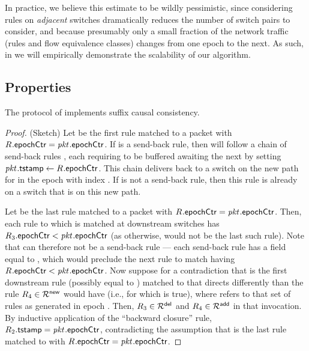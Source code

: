 In practice, we believe this estimate to be wildly pessimistic, since
considering rules on \textit{adjacent} switches dramatically reduces
the number of switch pairs to consider, and because presumably only a
small fraction of the network traffic (rules and flow equivalence
classes) changes from one epoch to the next.  As such, in
 we will empirically demonstrate the scalability of
our algorithm.

\subsection{Properties}
\label{sec:algo:properties}

\begin{prop}
  The protocol of  implements suffix
  causal consistency.
  \label{thm:scc}
\end{prop}

\begin{proof}
  (Sketch) Let  be the first rule  matched to a
  packet \pktID{} with $\ruleID{}{\epochField} =
  \pktID{}{\epochField}$.  If  is a send-back rule, then
  \pktID{} will follow a chain of send-back rules , each
  requiring \pktID{} to be buffered awaiting the next by setting
  $\pktID{}{\tagTmpField} \gets \ruleID{}{\epochField}$.  This chain
  delivers \pktID{} back to a switch on the new path for \pktID{} in
  the epoch with index \pktID{}{\epochField}.  If  is not a
  send-back rule, then this rule is already on a switch that is on
  this new path.

  Let  be the last rule  matched to a packet
  \pktID{} with $\ruleID{}{\epochField} = \pktID{}{\epochField}$.
  Then, each rule  to which \pktID{} is matched at
  downstream switches has $\ruleID{3}{\epochField} <
  \pktID{}{\epochField}$ (as otherwise,  would not be the
  last such rule).  Note that  can therefore not be a
  send-back rule --- each send-back rule has a \tagTmpField field
  equal to \pktID{}{\epochField}, which would preclude the next rule
   to match \pktID{} having $\ruleID{}{\epochField} <
  \pktID{}{\epochField}$.  Now suppose for a contradiction that
   is the first downstream rule (possibly equal to
  ) matched to \pktID{} that directs \pktID{} differently
  than the rule $\ruleID{4} \in \newRules$ would have (i.e., for which
   is true), where
  \newRules refers to that set of rules as generated in epoch
  \pktID{}{\epochField}.  Then, $\ruleID{3} \in \deleteRules$ and
  $\ruleID{4} \in \addRules$ in that invocation.  By inductive
  application of the ``backward closure'' rule,
  $\ruleID{2}{\tagTmpField} = \pktID{}{\epochField}$, contradicting
  the assumption that  is the last rule  matched to
  \pktID{} with $\ruleID{}{\epochField} = \pktID{}{\epochField}$.
\end{proof}

